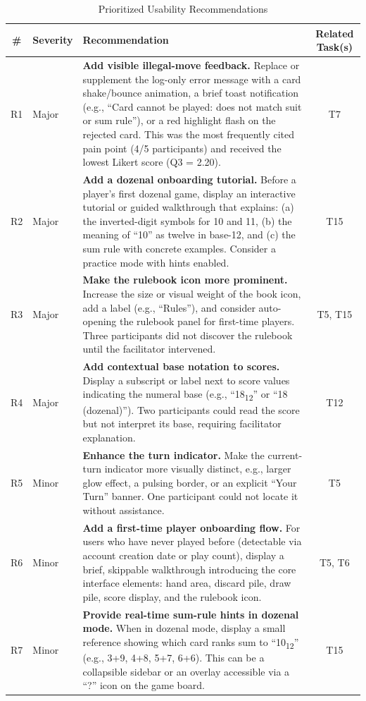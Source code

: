 \documentclass[12pt, titlepage]{article}
\begin{document}
\begin{table}[H]
\centering
\caption{Prioritized Usability Recommendations}
\begin{tabularx}{\textwidth}{c l X c}
\toprule
\textbf{\#} & \textbf{Severity} & \textbf{Recommendation} & \textbf{Related Task(s)} \\
\midrule
R1 & Major & \textbf{Add visible illegal-move feedback.} Replace or supplement the log-only error message with a card shake/bounce animation, a brief toast notification (e.g., ``Card cannot be played: does not match suit or sum rule''), or a red highlight flash on the rejected card. This was the most frequently cited pain point (4/5 participants) and received the lowest Likert score (Q3 = 2.20). & T7 \\
\midrule
R2 & Major & \textbf{Add a dozenal onboarding tutorial.} Before a player's first dozenal game, display an interactive tutorial or guided walkthrough that explains: (a) the inverted-digit symbols for 10 and 11, (b) the meaning of ``10'' as twelve in base-12, and (c) the sum rule with concrete examples. Consider a practice mode with hints enabled. & T15 \\
\midrule
R3 & Major & \textbf{Make the rulebook icon more prominent.} Increase the size or visual weight of the book icon, add a label (e.g., ``Rules''), and consider auto-opening the rulebook panel for first-time players. Three participants did not discover the rulebook until the facilitator intervened. & T5, T15 \\
\midrule
R4 & Major & \textbf{Add contextual base notation to scores.} Display a subscript or label next to score values indicating the numeral base (e.g., ``18\textsubscript{12}'' or ``18 (dozenal)''). Two participants could read the score but not interpret its base, requiring facilitator explanation. & T12 \\
\midrule
R5 & Minor & \textbf{Enhance the turn indicator.} Make the current-turn indicator more visually distinct, e.g., larger glow effect, a pulsing border, or an explicit ``Your Turn'' banner. One participant could not locate it without assistance. & T5 \\
\midrule
R6 & Minor & \textbf{Add a first-time player onboarding flow.} For users who have never played before (detectable via account creation date or play count), display a brief, skippable walkthrough introducing the core interface elements: hand area, discard pile, draw pile, score display, and the rulebook icon. & T5, T6 \\
\midrule
R7 & Minor & \textbf{Provide real-time sum-rule hints in dozenal mode.} When in dozenal mode, display a small reference showing which card ranks sum to ``10\textsubscript{12}'' (e.g., 3+9, 4+8, 5+7, 6+6). This can be a collapsible sidebar or an overlay accessible via a ``?'' icon on the game board. & T15 \\
\bottomrule
\end{tabularx}
\end{table}
\end{document}
